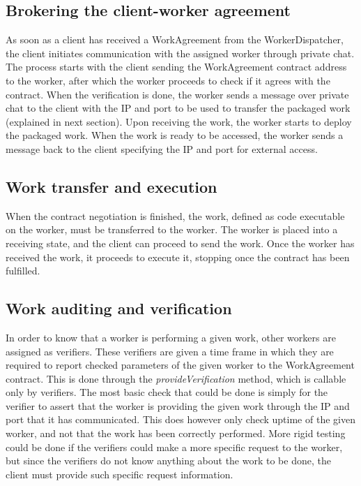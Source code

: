 \subsection{Brokering the client-worker agreement}
\label{sec:res:brokering}
As soon as a client has received a WorkAgreement from the WorkerDispatcher, the client initiates communication with the assigned worker through private chat. The process starts with the client sending the WorkAgreement contract address to the worker, after which the worker proceeds to check if it agrees with the contract. When the verification is done, the worker sends a message over private chat to the client with the IP and port to be used to transfer the packaged work (explained in next section). Upon receiving the work, the worker starts to deploy the packaged work. When the work is ready to be accessed, the worker sends a message back to the client specifying the IP and port for external access.

\subsection{Work transfer and execution}
When the contract negotiation is finished, the work, defined as code executable on the worker, must be transferred to the worker. The worker is placed into a receiving state, and the client can proceed to send the work. Once the worker has received the work, it proceeds to execute it, stopping once the contract has been fulfilled. 

\subsection{Work auditing and verification}
\label{sec:res:auditing}
In order to know that a worker is performing a given work, other workers are assigned as verifiers. These verifiers are given a time frame in which they are required to report checked parameters of the given worker to the WorkAgreement contract. This is done through the \textit{provideVerification} method, which is callable only by verifiers. The most basic check that could be done is simply for the verifier to assert that the worker is providing the given work through the IP and port that it has communicated. This does however only check uptime of the given worker, and not that the work has been correctly performed. More rigid testing could be done if the verifiers could make a more specific request to the worker, but since the verifiers do not know anything about the work to be done, the client must provide such specific request information.

